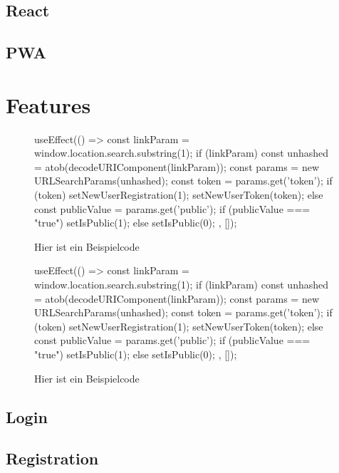 \documentclass[a4paper,12pt]{report}
\begin{document}
\section{React}
\section{PWA}
\chapter{Features}
\begin{figure}[h!]
\begin{code}
useEffect(() => {
	const linkParam = window.location.search.substring(1);
	if (linkParam) {
		const unhashed = atob(decodeURIComponent(linkParam));
		const params = new URLSearchParams(unhashed);
		const token = params.get('token');
		if (token) {
			setNewUserRegistration(1);
			setNewUserToken(token);
		} else {
			const publicValue = params.get('public');
			if (publicValue === "true") {
				setIsPublic(1);
			} else {
				setIsPublic(0);
			}
		}
	}
}, []);
\end{code}
	\caption{Hier ist ein Beispielcode}
	\label{fig:beispielcode}
\end{figure}
\begin{figure}[h!]
	\begin{code}
		useEffect(() => {
			const linkParam = window.location.search.substring(1);
			if (linkParam) {
				const unhashed = atob(decodeURIComponent(linkParam));
				const params = new URLSearchParams(unhashed);
				const token = params.get('token');
				if (token) {
					setNewUserRegistration(1);
					setNewUserToken(token);
				} else {
					const publicValue = params.get('public');
					if (publicValue === "true") {
						setIsPublic(1);
					} else {
						setIsPublic(0);
					}
				}
			}
		}, []);
	\end{code}
	\caption{Hier ist ein Beispielcode}
	\label{fig:beispielcode2}
\end{figure}

\section{Login}
\section{Registration}
\end{document}
